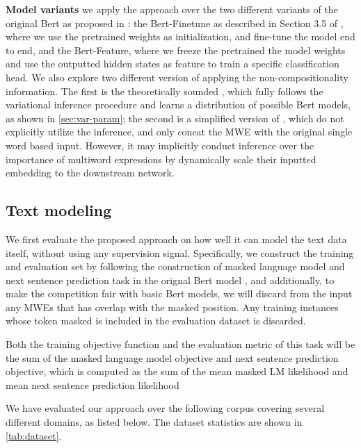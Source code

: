 \noindent \textbf{Model variants}
we apply the \BertMWE approach over the two different variants of the original Bert as proposed in \cite{devlin2018bert}: the Bert-Finetune as described in Section 3.5 of \cite{devlin2018bert}, where we use the pretrained weights as initialization, and fine-tune the model end to end, and the Bert-Feature, where we freeze the pretrained the model weights and use the outputted hidden states as feature to train a specific classification head. We also 
explore two different version of applying the non-compositionality information.
The first is the theoretically sounded \BertMWE, which fully follows the variational inference procedure and learns a distribution of possible Bert models, as shown in \autoref{sec:var-param}; the second is a simplified version of \BertMWE, 
which do not explicitly utilize the inference, and only concat the MWE with the original single word based input. However, it may implicitly conduct inference over the importance of multiword expressions by dynamically scale their inputted embedding to the downstream network.

\subsection{Text modeling} \label{sec:dataset}
We first evaluate the proposed approach on how well it can model the text data itself, without using any supervision signal.
Specifically, we construct the training and evaluation set by following the construction of masked language model and next sentence prediction task in the orignal Bert model \cite{devlin2018bert}, and additionally, to make the competition fair with basic Bert models, 
we will discard from the input any MWEs that has overlap with the masked position. 
Any training instances whose token masked is included in the evaluation dataset is discarded.

Both the training objective function and the evaluation metric of this task will be the sum of the  masked language model objective and next sentence prediction objective, which is computed as the sum of the mean masked LM likelihood and mean next sentence prediction likelihood

We have evaluated our approach over the following corpus covering several different domains, as listed below.
The dataset statistics are shown in \autoref{tab:dataset}. 


